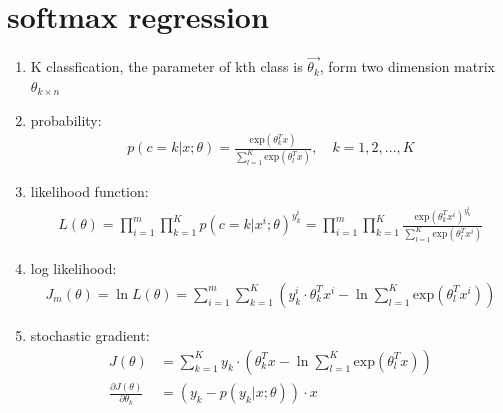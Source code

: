 \documentclass[12pt]{ctexart}%
\begin{document}
	\section{\quad softmax regression}
		\begin{enumerate}
			\item K classfication, the parameter of kth class  is $\vec{\theta_k}$, form two dimension matrix $\theta_{k \times n}$
			\item probability: 
				\begin{align}
					p(c=k|x;\theta) = \frac{\text{exp}(\theta_k^T x)}{\sum_{l=1}^{K}\text{exp}(\theta_l^T x)}, \quad k=1,2,...,K
				\end{align}
			\item likelihood function:
				\begin{align}
					L(\theta) = \prod_{i=1}^{m}\prod_{k=1}^{K}p(c=k|x^i; \theta)^{y_k^i} = \prod_{i=1}^{m}\prod_{k=1}^{K}\frac{\text{exp}(\theta_k^T x^i)^{y_k^i}}{\sum_{l=1}^{K}\text{exp}(\theta_l^T x^i)}
				\end{align}
			\item log likelihood:
				\begin{align}
					J_m(\theta) = \ln L(\theta) = \sum_{i=1}^{m}\sum_{k=1}^{K}\left( y_k^i \cdot \theta_k^T x^i - \ln \sum_{l=1}^{K}\text{exp}(\theta_l^T x^i)\right)
				\end{align}
			\item stochastic gradient:
				\begin{align}
					J(\theta) &= \sum_{k=1}^{K}y_k \cdot \left( \theta_k^T x - \ln \sum_{l=1}^{K} \text{exp}(\theta_l^T x)\right)\\
					\frac{\partial J(\theta)}{\partial \theta_k} &= \left( y_k - p(y_k|x;\theta) \right) \cdot x
				\end{align}
		\end{enumerate}
\end{document}

